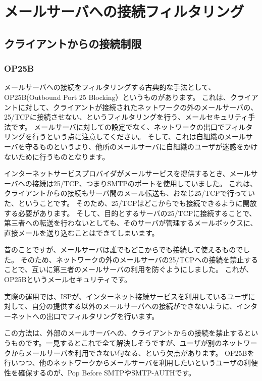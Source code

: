 \chapter{メールサーバへの接続フィルタリング}

\section{クライアントからの接続制限}

\subsection{OP25B}

メールサーバへの接続をフィルタリングする古典的な手法として、OP25B(Outbound Port 25 Blocking）というものがあります。
これは、クライアントに対して、クライアントが接続されたネットワークの外のメールサーバの、25/TCPに接続させない、というフィルタリングを行う、メールセキュリティ手法です。
メールサーバに対しての設定でなく、ネットワークの出口でフィルタリングを行うという点に注意してください。
そして、これは自組織のメールサーバを守るものというより、他所のメールサーバに自組織のユーザが迷惑をかけないために行うものとなります。

インターネットサービスプロバイダがメールサービスを提供するとき、メールサーバへの接続は25/TCP、つまりSMTPのポートを使用していました。
これは、クライアントからの接続もサーバ間のメール転送も、おなじ25/TCPで行っていた、ということです。
そのため、25/TCPはどこからでも接続できるように開放する必要があります。
そして、目的とするサーバの25/TCPに接続することで、第三者への転送を行わないとしても、そのサーバが管理するメールボックスに、直接メールを送り込むことはできてしまいます。

昔のことですが、メールサーバは誰でもどこからでも接続して使えるものでした。
そのため、ネットワークの外のメールサーバの25/TCPへの接続を禁止することで、互いに第三者のメールサーバの利用を防ぐようにしました。
これが、OP25Bというメールセキュリティです。

実際の運用では、ISPが、インターネット接続サービスを利用しているユーザに対して、自分の提供する以外のメールサーバへの接続ができないように、インターネットへの出口でフィルタリングを行います。

この方法は、外部のメールサーバへの、クライアントからの接続を禁止するというものです。一見するとこれで全て解決しそうですが、ユーザが別のネットワークからメールサーバを利用できない句なる、という欠点があります。
OP25Bを行いつつ、他のネットワークからメールサーバを利用したいというユーザの利便性を確保するのが、Pop Before SMTPやSMTP-AUTHです。

